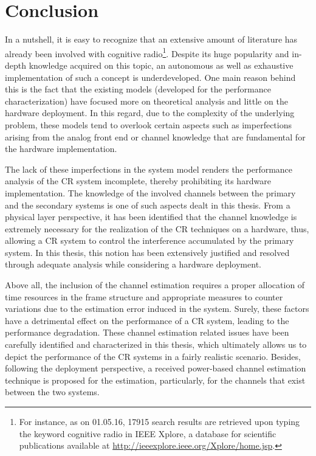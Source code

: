 \chapter{Conclusion}
\label{chap:Con}

In a nutshell, it is easy to recognize that an extensive amount of literature has already been involved with cognitive radio\footnote{For instance, as on 01.05.16, 17915 search results are retrieved upon typing the keyword cognitive radio in IEEE Xplore, a database for scientific publications available at \url{http://ieeexplore.ieee.org/Xplore/home.jsp}.}. Despite its huge popularity and in-depth knowledge acquired on this topic, an autonomous as well as exhaustive implementation of such a concept is underdeveloped. One main reason behind this is the fact that the existing models (developed for the performance characterization) have focused more on theoretical analysis and little on the hardware deployment. In this regard, due to the complexity of the underlying problem, these models tend to overlook certain aspects such as imperfections arising from the analog front end or channel knowledge that are fundamental for the hardware implementation. 

The lack of these imperfections in the system model renders the performance analysis of the CR system incomplete, thereby prohibiting its hardware implementation. The knowledge of the involved channels between the primary and the secondary systems is one of such aspects dealt in this thesis. 
From a physical layer perspective, it has been identified that the channel knowledge is extremely necessary for the realization of the CR techniques on a hardware, thus, allowing a CR system to control the interference accumulated by the primary system. In this thesis, this notion has been extensively justified and resolved through adequate analysis while considering a hardware deployment. %

Above all, the inclusion of the channel estimation requires a proper allocation of time resources in the frame structure and appropriate measures to counter variations due to the estimation error induced in the system. Surely, these factors have a detrimental effect on the performance of a CR system, leading to the performance degradation. These channel estimation related issues have been carefully identified and characterized in this thesis, which ultimately allows us to depict the performance of the CR systems in a fairly realistic scenario. Besides, following the deployment perspective, a received power-based channel estimation technique is proposed for the estimation, particularly, for the channels that exist between the two systems. 

